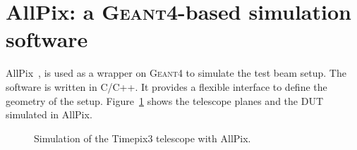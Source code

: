 \section{AllPix: a \textsc{Geant4}-based simulation software}
AllPix~\cite{allpix}, is used as a wrapper on \textsc{Geant4} to
simulate the test beam setup. The software is written in C/C++. It
provides a flexible interface to define the geometry of the
setup. Figure~\ref{fig:TPX3TelescopeAllpix} shows the telescope planes
and the DUT simulated in AllPix.

\begin{figure}[htbp]
  \centering
  \caption{Simulation of the Timepix3 telescope with AllPix.}
  \label{fig:TPX3TelescopeAllpix}
\end{figure}

